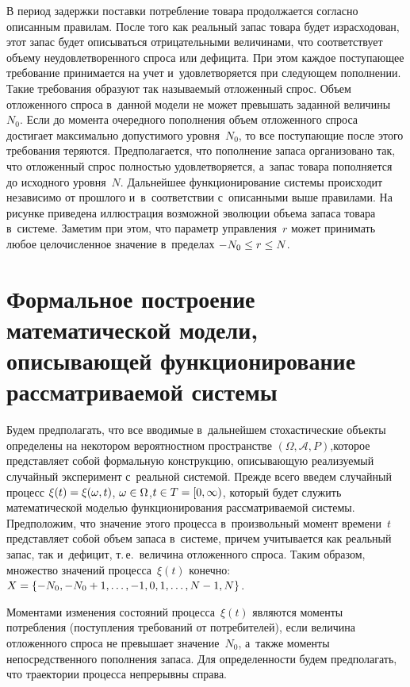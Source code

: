 \begin{multicols}{2}
  В период задержки поставки потребление товара продолжается согласно 
описанным правилам. После того как реальный запас товара будет 
израсходован, этот запас будет описываться отрицательными величинами, что 
соответствует объему неудовлетворенного спроса или дефицита. При этом 
каждое по\-сту\-па\-ющее требование принимается на учет и~удовлетворяется при 
сле\-ду\-ющем пополнении. Такие требования образуют так на\-зы\-ва\-емый 
отложенный спрос. Объем отложенного спроса в~данной модели не может 
превышать заданной величины~$N_0$. Если до момента очередного 
пополнения объем отложенного спроса достигает максимально допустимого 
уровня~$N_0$, то все по\-сту\-па\-ющие после этого требования теряются. 
Предполагается, что пополнение запаса организовано так, что отложенный 
спрос пол\-ностью удовлетворяется, а~запас товара пополняется до исходного 
уровня~$N$. Дальнейшее функционирование сис\-те\-мы происходит независимо 
от прошлого и~в~соответствии с~описанными выше правилами. На рисунке 
приведена иллюстрация воз\-мож\-ной эволюции объема запаса товара в~сис\-те\-ме. 
Заметим при этом, что параметр управ\-ле\-ния~$r$ может принимать любое 
целочисленное значение в~пределах $-N_0\hm\leq r\hm\leq N$.
  

\section{Формальное построение математической модели, 
описывающей функционирование рассматриваемой системы}

  Будем предполагать, что все вводимые в~дальнейшем стохастические 
объекты определены на некотором вероятностном про\-стран\-ст\-ве $(\Omega, 
\mathcal{A}, P)$,\linebreak которое пред\-став\-ля\-ет собой формальную конструкцию, 
описывающую реализуемый случайный эксперимент с~реальной сис\-те\-мой. 
Прежде всего введем случайный процесс $\xi(t)\hm= \xi(\omega, t)$, 
$\omega\hm\in \Omega$,\linebreak $t\hm\in T\hm= [0,\infty)$, который будет служить 
математической моделью функционирования рассматриваемой системы. 
Предположим, что значение этого процесса в~произвольный момент 
времени~$t$ пред\-став\-ля\-ет собой объем запаса в~сис\-те\-ме, причем учитывается 
как реальный запас, так и~дефицит, т.\,е.\ величина отложенного спроса. Таким 
образом, множество значений процесса~$\xi(t)$ конечно: $X\hm= \{-N_0, -
N_0\hm+1,\ldots , -1, 0, 1, \ldots , N\hm-1, N\}$.
  
  Моментами изменения состояний процесса~$\xi(t)$ являются моменты 
по\-треб\-ле\-ния (по\-ступ\-ле\-ния требований от по\-тре\-би\-те\-лей), если величина 
отложенного спроса не превышает значение~$N_0$, а~так\-же моменты 
непосредственного пополнения запаса. Для определенности будем 
предполагать, что траектории процесса непрерывны справа.
  

\end{multicols}
